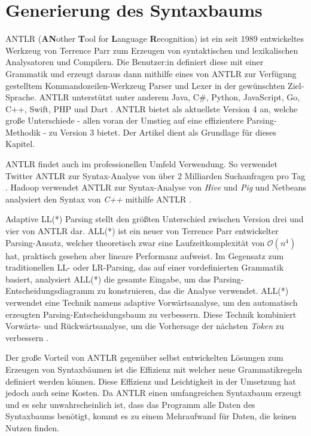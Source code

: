 \chapter{Generierung des Syntaxbaums}
\label{cha:antlr}

ANTLR (\textbf{AN}other \textbf{T}ool for \textbf{L}anguage \textbf{R}ecognition) ist ein seit 1989 entwickeltes Werkzeug von Terrence Parr zum Erzeugen von syntaktischen und lexikalischen Analysatoren und Compilern. Die Benutzer:in definiert diese mit einer Grammatik und erzeugt daraus dann mithilfe eines von ANTLR zur Verfügung gestelltem Kommandozeilen-Werkzeug Parser und Lexer in der gewünschten Ziel-Sprache. ANTLR unterstützt unter anderem Java, C\#, Python, JavaScript, Go, C++, Swift, PHP und Dart \parencite{antlrtargets}. ANTLR bietet als aktuellste Version 4 an, welche große Unterschiede - allen voran der Umstieg auf eine effizientere Parsing-Methodik - zu Version 3 bietet. Der Artikel \textcite{antlrMegaTutorial} dient als Grundlage für dieses Kapitel.

ANTLR findet auch im professionellen Umfeld Verwendung. So verwendet Twitter ANTLR zur Syntax-Analyse von über 2 Milliarden Suchanfragen pro Tag \parencite{antlrWebsite}. Hadoop verwendet ANTLR zur Syntax-Analyse von \textit{Hive} und \textit{Pig} und Netbeans analysiert den Syntax von \textit{C++} mithilfe ANTLR \parencite{antlrabout}.

Adaptive LL(*) Parsing stellt den größten Unterschied zwischen Version drei und vier von ANTLR dar. ALL(*) ist ein neuer von Terrence Parr entwickelter Parsing-Ansatz, welcher theoretisch zwar eine Laufzeitkomplexität von $\mathcal{O}(n^4)$ hat, praktisch gesehen aber lineare Performanz aufweist. Im Gegensatz zum traditionellen LL- oder LR-Parsing, das auf einer vordefinierten Grammatik basiert, analysiert ALL(*) die gesamte Eingabe, um das Parsing-Entscheidungsdiagramm zu konstruieren, das die Analyse verwendet. ALL(*) verwendet eine Technik namens adaptive Vorwärtsanalyse, um den automatisch erzeugten Parsing-Entscheidungsbaum zu verbessern. Diese Technik kombiniert Vorwärts- und Rückwärtsanalyse, um die Vorhersage der nächsten \textit{Token} zu verbessern \parencite{parr2014adaptive}.

Der große Vorteil von ANTLR gegenüber selbst entwickelten Lösungen zum Erzeugen von Syntaxbäumen ist die Effizienz mit welcher neue Grammatikregeln definiert werden können. Diese Effizienz und Leichtigkeit in der Umsetzung hat jedoch auch seine Kosten. Da ANTLR einen umfangreichen Syntaxbaum erzeugt und es sehr unwahrscheinlich ist, dass das Programm alle Daten des Syntaxbaums benötigt, kommt es zu einem Mehraufwand für Daten, die keinen Nutzen finden.

